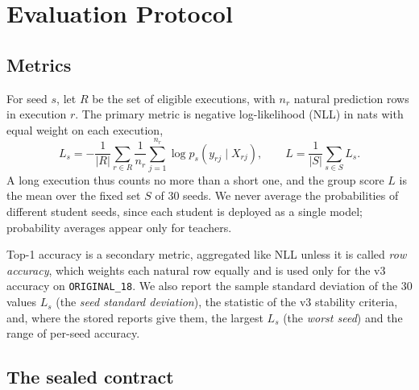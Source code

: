 \chapter{Evaluation Protocol}
\label{ch:evaluation}

\section{Metrics}
\label{sec:eval-metrics}

For seed $s$, let $R$ be the set of eligible executions, with $n_r$
natural prediction rows in execution $r$. The primary metric is
negative log-likelihood (NLL) in nats with equal weight on each
execution,
\begin{equation}
  L_s = -\frac{1}{|R|}
         \sum_{r\in R}\frac{1}{n_r}\sum_{j=1}^{n_r}
         \log p_s(y_{rj}\mid X_{rj}),
  \qquad L = \frac{1}{|S|}\sum_{s\in S} L_s .
  \label{eq:nll}
\end{equation}
A long execution thus counts no more than a short one, and the group
score $L$ is the mean over the fixed set $S$ of 30 seeds. We never
average the probabilities of different student seeds, since each
student is deployed as a single model; probability averages appear only
for teachers.

Top-1 accuracy is a secondary metric, aggregated like NLL unless it is
called \emph{row accuracy}, which weights each natural row equally and
is used only for the v3 accuracy on \texttt{ORIGINAL\_18}. We also
report the sample standard deviation of the 30 values $L_s$ (the
\emph{seed standard deviation}), the statistic of the v3 stability
criteria, and, where the stored reports give them, the largest $L_s$
(the \emph{worst seed}) and the range of per-seed accuracy.

\section{The sealed contract}
\label{sec:eval-contract}

